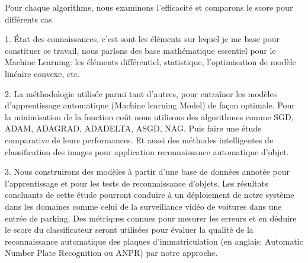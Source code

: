 		Pour chaque algorithme, nous examinons l'efficacité et comparons le score pour différents cas.
		\begin{list}{}{Les objectifs de notre travail regroupent les points suivants:}
			\item 1. État des connaissances, c’est sont les éléments sur lequel je me base pour constituer ce travail, nous parlons des base mathématique essentiel pour le Machine Learning: les éléments différentiel, statistique, l'optimisation de modèle linéaire convexe, etc.
			\item 2. La méthodologie utilisée parmi tant d’autres, pour entraîner les modèles d’apprentissage automatique (Machine learning Model) de façon optimale. Pour la minimisation de la fonction coût nous utilisons des algorithmes comme SGD, ADAM, ADAGRAD, ADADELTA, ASGD, NAG. Puis faire une étude comparative de leurs performances. 
			Et aussi des méthodes intelligentes de classification des images pour application reconnaissance automatique d’objet.
			
			\item 3. Nous construirons des modèles à partir d’une base de données annotée pour l'apprentissage et pour les tests de reconnaissance d'objets. Les résultats concluants de cette étude pourront conduire à un déploiement de notre système dans les domaines comme  celui de la surveillance vidéo de voitures dans une entrée de parking. Des métriques connues pour mesurer les erreurs et en déduire le score du classificateur seront utilisées pour évaluer la qualité de la reconnaissance automatique des plaques d’immatriculation (en anglais: Automatic Number Plate Recognition ou ANPR) par notre approche.
		\end{list}
	
	

		
		
		
		